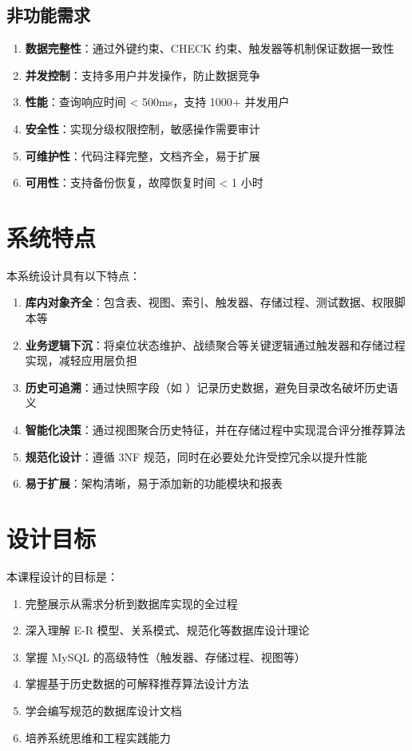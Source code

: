 \subsection{非功能需求}

\begin{enumerate}[label=\textbf{NR\arabic*}]
  \item \textbf{数据完整性}：通过外键约束、CHECK 约束、触发器等机制保证数据一致性
  \item \textbf{并发控制}：支持多用户并发操作，防止数据竞争
  \item \textbf{性能}：查询响应时间 < 500ms，支持 1000+ 并发用户
  \item \textbf{安全性}：实现分级权限控制，敏感操作需要审计
  \item \textbf{可维护性}：代码注释完整，文档齐全，易于扩展
  \item \textbf{可用性}：支持备份恢复，故障恢复时间 < 1 小时
\end{enumerate}

\section{系统特点}

本系统设计具有以下特点：

\begin{enumerate}
  \item \textbf{库内对象齐全}：包含表、视图、索引、触发器、存储过程、测试数据、权限脚本等
  \item \textbf{业务逻辑下沉}：将桌位状态维护、战绩聚合等关键逻辑通过触发器和存储过程实现，减轻应用层负担
  \item \textbf{历史可追溯}：通过快照字段（如 ）记录历史数据，避免目录改名破坏历史语义
  \item \textbf{智能化决策}：通过视图聚合历史特征，并在存储过程中实现混合评分推荐算法
  \item \textbf{规范化设计}：遵循 3NF 规范，同时在必要处允许受控冗余以提升性能
  \item \textbf{易于扩展}：架构清晰，易于添加新的功能模块和报表
\end{enumerate}

\section{设计目标}

本课程设计的目标是：

\begin{enumerate}
  \item 完整展示从需求分析到数据库实现的全过程
  \item 深入理解 E-R 模型、关系模式、规范化等数据库设计理论
  \item 掌握 MySQL 的高级特性（触发器、存储过程、视图等）
  \item 掌握基于历史数据的可解释推荐算法设计方法
  \item 学会编写规范的数据库设计文档
  \item 培养系统思维和工程实践能力
\end{enumerate}
